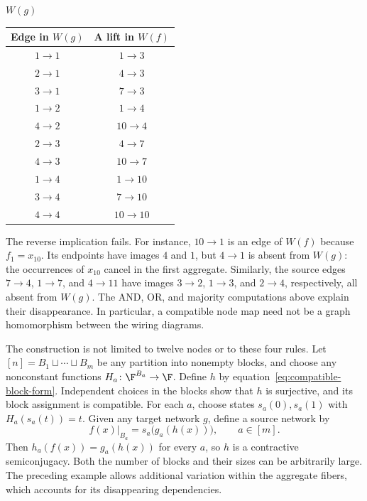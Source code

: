\begin{example}
\begin{center}
\begin{minipage}{0.45\linewidth}
            \small $W(g)$
        \end{minipage}
        \hfill
        \begin{minipage}{0.5\linewidth}
            \centering
            \small
            \renewcommand{\arraystretch}{1.1}
            \begin{tabular}{c|c}
                Edge in $W(g)$ & A lift in $W(f)$\\ \hline
                $1\to1$ & $1\to3$\\
                $2\to1$ & $4\to3$\\
                $3\to1$ & $7\to3$\\
                $1\to2$ & $1\to4$\\
                $4\to2$ & $10\to4$\\
                $2\to3$ & $4\to7$\\
                $4\to3$ & $10\to7$\\
                $1\to4$ & $1\to10$\\
                $3\to4$ & $7\to10$\\
                $4\to4$ & $10\to10$
            \end{tabular}
        \end{minipage}
    \end{center}

    The reverse implication fails. For instance, $10\to1$ is an edge of $W(f)$ because $f_1=x_{10}$. Its endpoints have images $4$ and $1$, but $4\to1$ is absent from $W(g)$: the occurrences of $x_{10}$ cancel in the first aggregate. Similarly, the source edges $7\to4$, $1\to7$, and $4\to11$ have images $3\to2$, $1\to3$, and $2\to4$, respectively, all absent from $W(g)$. The AND, OR, and majority computations above explain their disappearance. In particular, a compatible node map need not be a graph homomorphism between the wiring diagrams.
\end{example}

The construction is not limited to twelve nodes or to these four rules. Let $[n]=B_1\sqcup\cdots\sqcup B_m$ be any partition into nonempty blocks, and choose any nonconstant functions $H_a\colon\F^{B_a}\to\F$. Define $h$ by equation~\eqref{eq:compatible-block-form}. Independent choices in the blocks show that $h$ is surjective, and its block assignment is compatible. For each $a$, choose states $s_a(0),s_a(1)$ with $H_a(s_a(t))=t$. Given any target network $g$, define a source network by
\[
    f(x)|_{B_a}=s_a\bigl(g_a(h(x))\bigr),\qquad a\in[m].
\]
Then $h_a(f(x))=g_a(h(x))$ for every $a$, so $h$ is a contractive semiconjugacy. Both the number of blocks and their sizes can be arbitrarily large. The preceding example allows additional variation within the aggregate fibers, which accounts for its disappearing dependencies.

